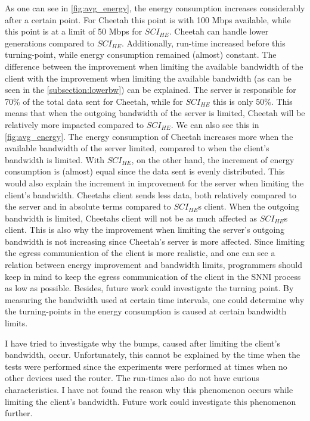 \documentclass[../thesis.tex]{subfiles}
\begin{document}
As one can see in \autoref{fig:avg_energy}, the energy consumption increases considerably after a certain point. For Cheetah this point is with 100 Mbps available, while this point is at a limit of 50 Mbps for $SCI_{HE}$. Cheetah can handle lower generations compared to $SCI_{HE}$. Additionally, run-time increased before this turning-point, while energy consumption remained (almost) constant. The difference between the improvement when limiting the available bandwidth of the client with the improvement when limiting the available bandwidth (as can be seen in the \autoref{subsection:lowerbw}) can be explained. The server is responsible for 70\% of the total data sent for Cheetah, while for $SCI_{HE}$ this is only 50\%. This means that when the outgoing bandwidth of the server is limited, Cheetah will be relatively more impacted compared to $SCI_{HE}$. We can also see this in \autoref{fig:avg_energy}. The energy consumption of Cheetah increases more when the available bandwidth of the server limited, compared to when the client's bandwidth is limited. With $SCI_{HE}$, on the other hand, the increment of energy consumption is (almost) equal since the data sent is evenly distributed. This would also explain the increment in improvement for the server when limiting the client's bandwidth. Cheetahs client sends less data, both relatively compared to the server and in absolute terms compared to $SCI_{HE}$s client. When the outgoing bandwidth is limited, Cheetahs client will not be as much affected as $SCI_{HE}$s client. This is also why the improvement when limiting the server's outgoing bandwidth is not increasing since Cheetah's server is more affected. Since limiting the egress communication of the client is more realistic, and one can see a relation between energy improvement and bandwidth limits, programmers should keep in mind to keep the egress communication of the client in the SNNI process as low as possible. Besides, future work could investigate the turning point. By measuring the bandwidth used at certain time intervals, one could determine why the turning-points in the energy consumption is caused at certain bandwidth limits. 

I have tried to investigate why the bumps, caused after limiting the client's bandwidth, occur. Unfortunately, this cannot be explained by the time when the tests were performed since the experiments were performed at times when no other devices used the router. The run-times also do not have curious characteristics. I have not found the reason why this phenomenon occurs while limiting the client's bandwidth. Future work could investigate this phenomenon further.
\end{document}
